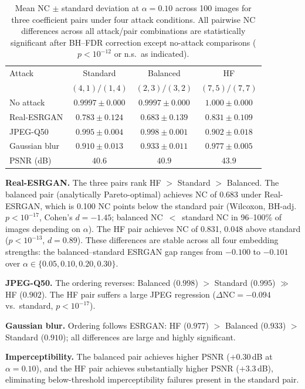 \documentclass[conference]{IEEEtran}
\begin{document}
\begin{table}[t]
\caption{Mean NC $\pm$ standard deviation at $\alpha=0.10$ across 100
images for three coefficient pairs under four attack conditions.
All pairwise NC differences across all attack/pair combinations are
statistically significant after BH--FDR correction except no-attack
comparisons ($p < 10^{-12}$ or n.s.\ as indicated).}
\label{tab:pairs}
\centering
\begin{tabular}{lccc}
\toprule
Attack & Standard & Balanced & HF \\
       & $(4,1)/(1,4)$ & $(2,3)/(3,2)$ & $(7,5)/(7,7)$ \\
\midrule
No attack      & $0.9997 \pm 0.000$ & $0.9997 \pm 0.000$ & $1.000 \pm 0.000$ \\
Real-ESRGAN    & $0.783 \pm 0.124$ & $0.683 \pm 0.139$   & $0.831 \pm 0.109$ \\
JPEG-Q50       & $0.995 \pm 0.004$ & $0.998 \pm 0.001$   & $0.902 \pm 0.018$ \\
Gaussian blur  & $0.910 \pm 0.013$ & $0.933 \pm 0.011$   & $0.977 \pm 0.005$ \\
\midrule
PSNR (dB)      & $40.6$ & $40.9$ & $43.9$ \\
\bottomrule
\end{tabular}
\end{table}

\textbf{Real-ESRGAN.} The three pairs rank HF $>$ Standard $>$ Balanced.
The balanced pair (analytically Pareto-optimal) achieves NC of 0.683
under Real-ESRGAN, which is 0.100 NC points below the standard pair
(Wilcoxon, BH-adj.\ $p < 10^{-17}$, Cohen's $d = -1.45$; balanced
NC~$<$~standard NC in 96--100\% of images depending on $\alpha$). The
HF pair achieves NC of 0.831, 0.048 above standard ($p < 10^{-13}$,
$d = 0.89$). These differences are stable across all four embedding
strengths: the balanced--standard ESRGAN gap ranges from $-0.100$ to
$-0.101$ over $\alpha \in \{0.05, 0.10, 0.20, 0.30\}$.

\textbf{JPEG-Q50.} The ordering reverses: Balanced ($0.998$) $>$ Standard
($0.995$) $\gg$ HF ($0.902$). The HF pair suffers a large JPEG regression
($\Delta\mathrm{NC} = -0.094$ vs.\ standard, $p < 10^{-17}$).

\textbf{Gaussian blur.} Ordering follows ESRGAN: HF ($0.977$) $>$
Balanced ($0.933$) $>$ Standard ($0.910$); all differences are large and
highly significant.

\textbf{Imperceptibility.} The balanced pair achieves higher PSNR
($+0.30$\,dB at $\alpha=0.10$), and the HF pair achieves substantially
higher PSNR ($+3.3$\,dB), eliminating below-threshold imperceptibility
failures present in the standard pair.
\end{document}
